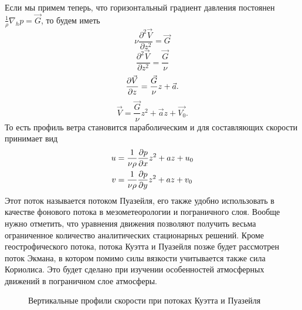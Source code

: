     Если мы примем теперь, что горизонтальный градиент давления постоянен  $\frac{1}{\rho}\nabla_h p=\vec{G}$, то будем иметь
    \begin{equation}
        \nu\frac{\partial^2 \vec{V}}{\partial z^2}=\vec{G} 
    \end{equation} 
    \begin{equation}
        \frac{\partial^2 \vec{V}}{\partial z^2}=\frac{\vec{G}}{\nu}  
    \end{equation} 
    \begin{equation}
        \displaystyle\frac{\partial \vec{V}}{\partial z}=\frac{\vec{G}}{\nu}z+\vec{a}.  
    \end{equation} 
    \begin{equation}
        \vec{V}=\frac{\vec{G}}{\nu}z^2+\vec{a}z+\vec{V_0}. 
    \end{equation} 
    То есть профиль ветра становится параболическим и для составляющих скорости принимает вид
    \begin{equation}
    \begin{aligned} 
        u &= \frac{1}{\nu\rho} \displaystyle\frac{\partial p}{\partial x}z^2 + az + u_0 \\
        v &= \frac{1}{\nu\rho} \displaystyle\frac{\partial p}{\partial y}z^2 + az + v_0 
    \end{aligned} 
    \end{equation} 
    Этот поток называется потоком Пуазейля, его также удобно использовать в качестве фонового потока в мезометеорологии и пограничного слоя. Вообще нужно отметить, что уравнения движения позволяют получить весьма ограниченное количество аналитических стационарных решений. Кроме геострофического потока, потока Куэтта и Пуазейля позже будет рассмотрен поток Экмана, в котором помимо силы вязкости учитывается также сила Кориолиса. Это будет сделано при изучении особенностей атмосферных движений в пограничном слое атмосферы. 

    \begin{figure}[!h]
    \label{fig:simple_flows}
    \caption{Вертикальные профили скорости при потоках Куэтта и Пуазейля}
    \centering
    \end{figure}


